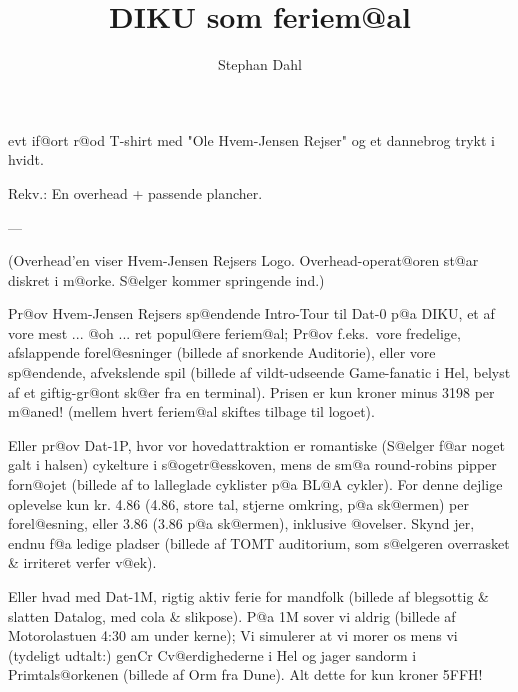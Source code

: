 \documentclass[a4paper,11pt]{article}
\begin{document}
\title{DIKU som feriem@al}

\author{Stephan Dahl}



\maketitle

\begin{roles}
 evt if@ort r@od T-shirt med "Ole Hvem-Jensen
	Rejser" og et dannebrog trykt i hvidt.
\end{roles}

\begin{sketch}




Rekv.:	En overhead + passende plancher.

---

(Overhead'en viser Hvem-Jensen Rejsers Logo. Overhead-operat@oren st@ar
diskret i m@orke. S@elger kommer springende ind.)

	Pr@ov Hvem-Jensen Rejsers sp@endende Intro-Tour til
Dat-0 p@a DIKU, et af vore mest ... @oh ... ret popul@ere feriem@al;
Pr@ov f.eks.\ vore fredelige, afslappende forel@esninger (billede af
snorkende Auditorie), eller vore sp@endende, afvekslende spil (billede
af vildt-udseende Game-fanatic i Hel, belyst af et giftig-gr@ont sk@er
fra en terminal). Prisen er kun kroner minus 3198 per m@aned! (mellem
hvert feriem@al skiftes tilbage til logoet).

Eller pr@ov Dat-1P, hvor vor hovedattraktion er romantiske (S@elger
f@ar noget galt i halsen) cykelture i s@ogetr@esskoven, mens de sm@a
round-robins pipper forn@ojet (billede af to lalleglade cyklister p@a
BL@A cykler). For denne dejlige oplevelse kun kr. 4.86 (4.86, store
tal, stjerne omkring, p@a sk@ermen) per forel@esning, eller 3.86 (3.86
p@a sk@ermen), inklusive @ovelser. Skynd jer, endnu f@a ledige pladser
(billede af TOMT auditorium, som s@elgeren overrasket \& irriteret
verfer v@ek).

Eller hvad med Dat-1M, rigtig aktiv ferie for mandfolk (billede af
blegsottig \& slatten Datalog, med cola \& slikpose). P@a 1M sover vi
aldrig (billede af Motorolastuen 4:30 am under kerne); Vi simulerer at
vi morer os mens vi (tydeligt udtalt:) genCr Cv@erdighederne i Hel og
jager sandorm i Primtals@orkenen (billede af Orm fra Dune). Alt dette
for kun kroner 5FFH!


\end{sketch}
\end{document}
